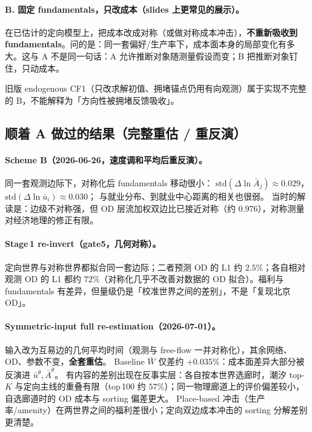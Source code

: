 \documentclass[11pt,a4paper]{article}
\begin{document}
\paragraph{B. 固定 fundamentals，只改成本（slides 上更常见的展示）。}
在已估计的定向模型上，把成本改成对称（或做对称成本冲击），\textbf{不重新吸收到 fundamentals}。问的是：同一套偏好/生产率下，成本面本身的局部变化有多大。这与 A 不是同一句话：A 允许推断对象随测量假设而变；B 把推断对象钉住，只动成本。

旧版 endogenous CF1（只改求解初值、拥堵锚点仍用有向观测）属于实现不完整的 B，不能解释为「方向性被拥堵反馈吸收」。

\subsection*{顺着 A 做过的结果（完整重估 / 重反演）}

\paragraph{Scheme B（2026-06-26，速度调和平均后重反演）。}
同一套观测边际下，对称化后 fundamentals 移动很小：
$\mathrm{std}(\Delta\ln\bar A_j)\approx 0.029$，$\mathrm{std}(\Delta\ln\bar u_i)\approx 0.030$；
与就业分布、到就业中心距离的相关也很弱。
当时的解读是：边级不对称强，但 OD 层流加权双边比已接近对称（约 $0.976$），对称测量对经济地理的修正有限。

\paragraph{Stage\,1 re-invert（gate5，几何对称）。}
定向世界与对称世界都拟合同一套边际；二者预测 OD 的 L1 约 $2.5\%$；各自相对观测 OD 的 L1 都约 $72\%$（对称化几乎不改善对数据的 OD 拟合）。福利与 fundamentals 有差异，但量级仍是「校准世界之间的差别」，不是「复现北京 OD」。

\paragraph{Symmetric-input full re-estimation（2026-07-01）。}
输入改为互易边的几何平均时间（观测与 free-flow 一并对称化），其余网络、OD、参数不变，\textbf{全套重估}。
Baseline $\bar W$ 仅差约 $+0.035\%$：成本面差异大部分被反演进 $\bar u^\theta,\bar A^\theta$。
有内容的差别出现在反事实层：各自按本世界选廊时，潮汐 top-$K$ 与定向主线的重叠有限（top\,100 约 $57\%$）；同一物理廊道上的评价偏差较小，自选廊道时的 OD 成本与 sorting 偏差更大。
Place-based 冲击（生产率/amenity）在两世界之间的福利差很小；定向双边成本冲击的 sorting 分解差别更清楚。
\end{document}
